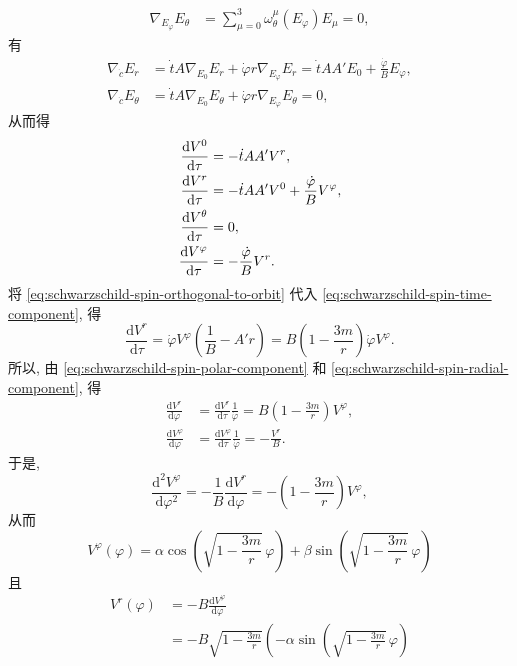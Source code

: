 \begin{description}[font=\normalfont,leftmargin=2em,labelwidth=1.5em]
\begin{enumerate}[label=(\alph*),ref=\alph*,leftmargin=*]
\begin{align*}
  \nabla_{E_\varphi}E_\theta&=\sum_{\mu=0}^3\omega_\theta^\mu(E_\varphi)E_\mu=0,
\end{align*}
有
\begin{align*}
  \nabla_{\dot c}E_r&=\dot t A\nabla_{E_0}E_r+\dot\varphi r\nabla_{E_\varphi}E_r
      =\dot t AA'E_0+\frac{\dot\varphi}{B}E_\varphi,\\
  \nabla_{\dot c}E_\theta&=\dot t A\nabla_{E_0}E_\theta+\dot\varphi r\nabla_{E_\varphi}E_\theta=0,
\end{align*}
从而得
\begin{align}
  \frac{\mathrm{d}V^0}{\mathrm{d}\tau}&=-\dot t AA'V^r,\label{eq:schwarzschild-spin-time-component}\\
  \frac{\mathrm{d}V^r}{\mathrm{d}\tau}&=-\dot t AA'V^0+\frac{\dot\varphi}{B}V^\varphi,\notag\\
  \frac{\mathrm{d}V^\theta}{\mathrm{d}\tau}&=0,\label{eq:schwarzschild-spin-polar-component}\\
  \frac{\mathrm{d}V^\varphi}{\mathrm{d}\tau}&=-\frac{\dot\varphi}{B}V^r.\notag
\end{align}
将 \eqref{eq:schwarzschild-spin-orthogonal-to-orbit} 代入 \eqref{eq:schwarzschild-spin-time-component}, 得
\begin{equation}\label{eq:schwarzschild-spin-radial-component}
  \frac{\mathrm{d}V^r}{\mathrm{d}\tau}
   =\dot\varphi V^\varphi\left(\frac{1}{B}-A'r\right)
   =B\left(1-\frac{3m}{r}\right)\dot\varphi V^\varphi.
\end{equation}
所以, 由 \eqref{eq:schwarzschild-spin-polar-component} 和 \eqref{eq:schwarzschild-spin-radial-component}, 得
\begin{align*}
  \frac{\mathrm{d}V^r}{\mathrm{d}\varphi}
   &=\frac{\mathrm{d}V^r}{\mathrm{d}\tau}\frac{1}{\dot\varphi}
     =B\left(1-\frac{3m}{r}\right)V^\varphi,\\
  \frac{\mathrm{d}V^\varphi}{\mathrm{d}\varphi}
   &=\frac{\mathrm{d}V^\varphi}{\mathrm{d}\tau}\frac{1}{\dot\varphi}=-\frac{V^r}{B}.
\end{align*}
于是,
\[
  \frac{\mathrm{d}^2V^\varphi}{\mathrm{d}\varphi^2}
   =-\frac{1}{B}\frac{\mathrm{d}V^r}{\mathrm{d}\varphi}
   =-\left(1-\frac{3m}{r}\right)V^\varphi,
\]
从而
\[
  V^\varphi(\varphi)=\alpha\cos\left(\sqrt{1-\frac{3m}{r}}\,\varphi\right)
      +\beta\sin\left(\sqrt{1-\frac{3m}{r}}\,\varphi\right)
\]
且
\begin{align*}
  V^r(\varphi)&=-B\frac{\mathrm{d}V^\varphi}{\mathrm{d}\varphi}\\
    &=-B\sqrt{1-\frac{3m}{r}}
       \left(-\alpha\sin\left(\sqrt{1-\frac{3m}{r}}\,\varphi\right)

\end{align*}
\end{enumerate}
\end{description}

